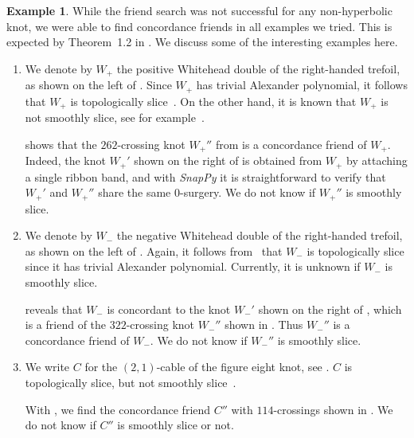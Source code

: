 \documentclass{amsart} %
\theoremstyle{thm}
\theoremstyle{definition}
\newtheorem{ex}[Theorem]{Example}
\numberwithin{equation}{section}
\begin{document}
\begin{ex}\label{ex:conc_freinds}
   While the friend search was not successful for any non-hyperbolic knot, we were able to find concordance friends in all examples we tried. This is expected by Theorem~1.2 in \cite{BKM_traces}. We discuss some of the interesting examples here.
    \begin{enumerate}
        \item We denote by $W_+$ the positive Whitehead double of the right-handed trefoil, as shown on the left of . Since $W_+$ has trivial Alexander polynomial, it follows that $W_+$ is topologically slice~\cite{Freedman}. On the other hand, it is known that $W_+$ is not smoothly slice, see for example~\cite{Hedden_Whitehead}.
        
         shows that the $262$-crossing knot $W_+''$ from  is a concordance friend of $W_+$. Indeed, the knot $W_+'$ shown on the right of  is obtained from $W_+$ by attaching a single ribbon band, and with {\em SnapPy} it is straightforward to verify that $W_+'$ and $W_+''$ share the same $0$-surgery. We do not know if $W_+''$ is smoothly slice.
        
        \item We denote by $W_-$ the negative Whitehead double of the right-handed trefoil, as shown on the left of . Again, it follows from~\cite{Freedman} that $W_-$ is topologically slice since it has trivial Alexander polynomial. Currently, it is unknown if $W_-$ is smoothly slice.
        
         reveals that $W_-$ is concordant to the knot $W_-'$ shown on the right of , which is a friend of the $322$-crossing knot $W_-''$ shown in . Thus $W_-''$ is a concordance friend of $W_-$. We do not know if $W_-''$ is smoothly slice.
        
        \item We write $C$ for the $(2,1)$-cable of the figure eight knot, see . $C$ is topologically slice, but not smoothly slice~\cite{cable_fig_8}. 

        With , we find the concordance friend $C''$ with $114$-crossings shown in . We do not know if $C''$ is smoothly slice or not.
    \end{enumerate}
\end{ex}
\end{document}
